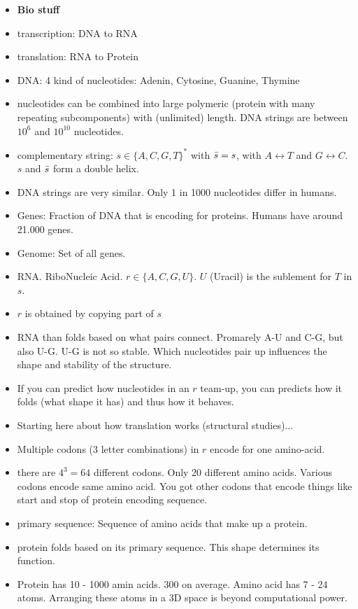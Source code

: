 \documentclass[runningheads]{llncs}
\begin{document}
\begin{itemize}
    \item \textbf{Bio stuff}
    \item transcription: DNA to RNA
    \item translation: RNA to Protein
    \item DNA: 4 kind of nucleotides: Adenin, Cytosine, Guanine, Thymine
    \item nucleotides can be combined into large polymeric (protein with many repeating subcomponents) with (unlimited) length. DNA strings are between $10^6$ and $10^{10}$ nucleotides. 
    \item complementary string: $s \in \{A,C,G,T\}^*$ with $\Bar{s} = s$, with $A \leftrightarrow T$ and $G \leftrightarrow C$. $s$ and $\Bar{s}$ form a double helix.
    \item DNA strings are very similar. Only 1 in 1000 nucleotides differ in humans. 
    \item Genes: Fraction of DNA that is encoding for proteins. Humans have around 21.000 genes. 
    \item Genome: Set of all genes. 
    \item RNA. RiboNucleic Acid. $r \in \{A, C, G, U\}$. $U$ (Uracil) is the sublement for $T$ in $s$.
    \item $r$ is obtained by copying part of $s$
    \item RNA than folds based on what pairs connect. Promarely A-U and C-G, but also U-G. U-G is not so stable. Which nucleotides pair up influences the shape and stability of the structure.
    \item If you can predict how nucleotides in an $r$ team-up, you can predicts how it folds (what shape it has) and thus how it behaves. 
    \item Starting here about how translation works (structural studies)... 
    \item Multiple codons (3 letter combinations) in $r$ encode for one amino-acid.
    \item there are $4^3 = 64$ different codons. Only 20 different amino acids. Various codons encode same amino acid. You got other codons that encode things like start and stop of protein encoding sequence.
    \item primary sequence: Sequence of amino acids that make up a protein. 
    \item protein folds based on its primary sequence. This shape determines its function. 
    \item Protein has 10 - 1000 amin acids. 300 on average. Amino acid has 7 - 24 atoms. Arranging these atoms in a 3D space is beyond computational power.

\end{itemize}
\end{document}
